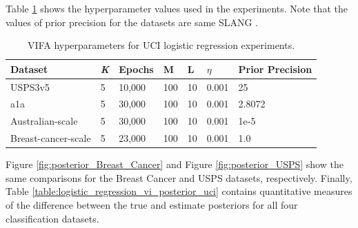 \documentclass[10pt]{article} %
\begin{document}
Table \ref{table:vifa_uci_logistic_hyperparameters} shows the hyperparameter values used in the experiments. Note that the values of prior precision for the datasets are same SLANG \cite{mishkin2018}.

\begin{table}[!h]
\caption{VIFA hyperparameters for UCI logistic regression experiments.}
\label{table:vifa_uci_logistic_hyperparameters}
\begin{center}
\begin{tabular}{l|llllll}
\textbf{Dataset}    & \textit{K} & \textbf{Epochs} & M   & L  & $\eta$   & \textbf{Prior Precision} \\ \hline
USPS3v5             & 5          & 10,000          & 100 & 10 & 0.001 & 25                       \\
a1a                 & 5          & 30,000          & 100 & 10 & 0.001 & 2.8072                   \\
Australian-scale    & 5          & 30,000          & 100 & 10 & 0.001 & 1e-5                     \\
Breast-cancer-scale & 5          & 23,000          & 100 & 10 & 0.001 & 1.0                     
\end{tabular}
\end{center}
\end{table}

Figure \ref{fig:posterior_Breast_Cancer} and Figure \ref{fig:posterior_USPS} show the same comparisons for the Breast Cancer and USPS datasets, respectively. Finally, Table \ref{table:logistic_regression_vi_posterior_uci} contains quantitative measures of the difference between the true and estimate posteriors for all four classification datasets.
\end{document}
